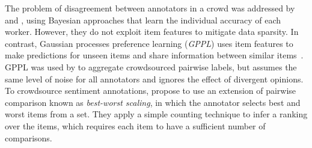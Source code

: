 The problem of disagreement between annotators in a crowd was addressed by \citet{chen2013pairwise}
and \citet{wang2016blind},
using Bayesian approaches that learn the individual accuracy of each worker.
However, they do not %
exploit item features to mitigate data sparsity.
In contrast, Gaussian processes preference learning (\emph{GPPL})
uses item features to make predictions for unseen items and
share information between similar items~\citep{chu2005preference}.
GPPL was used by \citet{simpson2018finding} to aggregate crowdsourced pairwise labels,
but assumes the same level of noise for all annotators and ignores the effect of divergent opinions.
To crowdsource sentiment annotations, 
\citet{kiritchenko2016capturing} propose to use an extension of pairwise comparison
known as \emph{best-worst scaling}, in which the annotator selects best and worst items from a set.
They apply a simple counting technique to infer a ranking over the items, which requires 
each item to have a sufficient number of comparisons.


